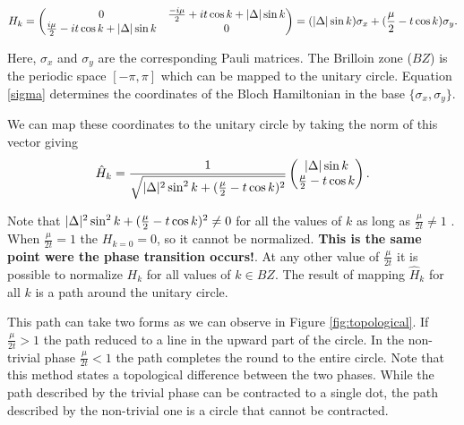 \begin{equation}
H_k = \begin{pmatrix} 
      0    &  \frac{-i \mu}{2} + it \cos k + \vert \Delta \vert  \sin k  \\ 
       \frac{i \mu}{2} - it \cos k + \vert \Delta \vert \sin k  &  0 
    \end{pmatrix}
    = (\vert \Delta \vert \sin k) \sigma_x + (\frac{\mu}{2}- t \cos k) \sigma_y.
\label{sigma}
\end{equation}




\noindent Here, $\sigma_x$ and $\sigma_y$ are the corresponding Pauli matrices. The Brilloin zone ($BZ$) is the periodic space  $[-\pi , \pi]$ which can be mapped to the unitary circle.   Equation \eqref{sigma} determines  the coordinates of the Bloch Hamiltonian in the base $\{\sigma_x, \sigma_y\}$. 

We can map these coordinates to the unitary circle by taking the norm of this vector giving
\begin{equation}
     \hat{H}_k= \frac{1}{\sqrt{\vert \Delta \vert^2 \sin^2 k + (\frac{\mu}{2}- t \cos k)^2}}
     \begin{pmatrix} 
      \vert \Delta \vert \sin k    \\ 
      \frac{\mu}{2}- t \cos k 
    \end{pmatrix}. 
\end{equation}

\noindent Note that $\vert \Delta \vert^2 \sin^2 k + (\frac{\mu}{2}- t \cos k)^2 \neq 0$ for all the values of $k$ as long as $\frac{\mu}{2t} \neq 1$ . When $\frac{\mu}{2t} = 1$ the $H_{k=0}=0$, so it cannot be normalized. \textbf{This is the same point were the phase transition occurs!}. At any other value of $\frac{\mu}{2t}$ it is possible to normalize $H_{k}$ for all values of $k\in BZ$. The result of mapping $\hat{H}_k$ for all $k$ is a path around the unitary circle. 

This path can take two forms as we can observe in Figure \ref{fig:topological}. If $\frac{\mu}{2t} > 1$ the path reduced to a line in the upward part of the circle. In the non-trivial phase $\frac{\mu}{2t} < 1$ the path completes the round to the entire circle. Note that this method states a topological difference between the two phases. While the path described by the trivial phase can be contracted to a single dot, the path described by the non-trivial one is a circle that cannot be contracted.


